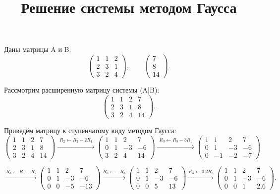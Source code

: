 \documentclass[12pt,a4paper]{article}
\title{Решение системы методом Гаусса}
\date{}
\begin{document}
\maketitle


Даны матрицы A и B.
\[
\left(
\begin{array}{ccc}
1 & 1 & 2\\
2 & 3 & 1\\
3 & 2 & 4
\end{array}
\right),
\qquad
\left(
\begin{array}{c}
7\\
8\\
14
\end{array}
\right).
\]

Рассмотрим расширенную матрицу системы (A|B):
\[
\left(
\begin{array}{ccc|c}
1 & 1 & 2 & 7\\
2 & 3 & 1 & 8\\
3 & 2 & 4 & 14
\end{array}
\right).
\]

Приведём матрицу к ступенчатому виду методом Гаусса:
\[
\left(
\begin{array}{ccc|c}
1 & 1 & 2 & 7\\
2 & 3 & 1 & 8\\
3 & 2 & 4 & 14
\end{array}
\right)
\xrightarrow{\substack{R_2\leftarrow R_2-2R_1}}
\left(
\begin{array}{ccc|c}
1 & 1 & 2 & 7\\
0 & 1 & -3 & -6\\
3 & 2 & 4 & 14
\end{array}
\right)
\xrightarrow{\substack{R_3\leftarrow R_3-3R_1}}
\left(
\begin{array}{ccc|c}
1 & 1 & 2 & 7\\
0 & 1 & -3 & -6\\
0 & -1 & -2 & -7
\end{array}
\right)
\]

\[
\xrightarrow{R_3\leftarrow R_3+R_2}
\left(
\begin{array}{ccc|c}
1 & 1 & 2 & 7\\
0 & 1 & -3 & -6\\
0 & 0 & -5 & -13
\end{array}
\right)
\xrightarrow{R_3\leftarrow -R_3}
\left(
\begin{array}{ccc|c}
1 & 1 & 2 & 7\\
0 & 1 & -3 & -6\\
0 & 0 & 5 & 13
\end{array}
\right)
\xrightarrow{R_3\leftarrow 0.2R_3}
\left(
\begin{array}{ccc|c}
1 & 1 & 2 & 7\\
0 & 1 & -3 & -6\\
0 & 0 & 1 & 2.6
\end{array}
\right).
\]
\end{document}
